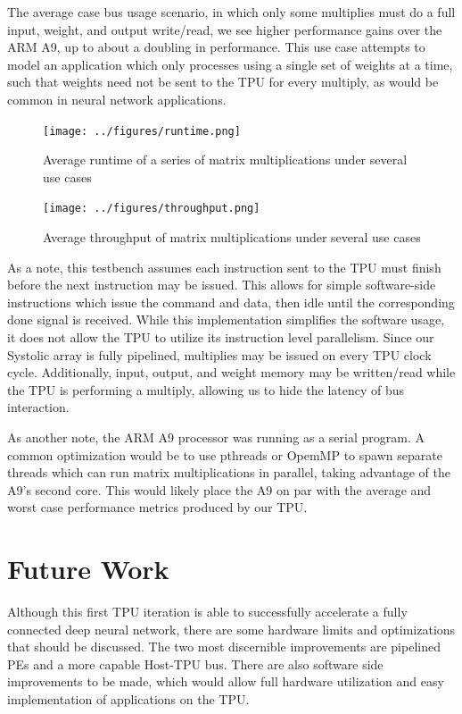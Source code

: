 \documentclass[11pt, conference, onecolumn]{IEEEtran}
\begin{document}
        The average case bus usage scenario, in which only some multiplies must do a
        full input, weight, and output write/read, we see higher performance gains over
        the ARM A9, up to about a doubling in performance. This use case attempts to model
        an application which only processes using a single set of weights at a time, such
        that weights need not be sent to the TPU for every multiply, as would be common
        in neural network applications.

        \begin{figure}[htbp]
            \centering
            \texttt{[image: ../figures/runtime.png]}
            \caption{Average runtime of a series of matrix multiplications under several
                     use cases}
        \end{figure}

        \newpage

        \begin{figure}[htbp]
            \centering
            \texttt{[image: ../figures/throughput.png]}
            \caption{Average throughput of matrix multiplications under several use cases}
        \end{figure}

        As a note, this testbench assumes each instruction sent to the TPU must finish
        before the next instruction may be issued. This allows for simple software-side
        instructions which issue the command and data, then idle until the corresponding
        done signal is received. While this implementation simplifies the software usage,
        it does not allow the TPU to utilize its instruction level parallelism. Since our
        Systolic array is fully pipelined, multiplies may be issued on every TPU clock
        cycle. Additionally, input, output, and weight memory may be written/read while
        the TPU is performing a multiply, allowing us to hide the latency of bus
        interaction.

        As another note, the ARM A9 processor was running as a serial program. A
        common optimization would be to use pthreads or OpemMP to spawn separate threads
        which can run matrix multiplications in parallel, taking advantage of the A9's
        second core. This would likely place the A9 on par with the average and worst case
        performance metrics produced by our TPU.

\section{Future Work}
    Although this first TPU iteration is able to successfully accelerate a fully connected
    deep neural network, there are some hardware limits and optimizations that should be
    discussed. The two most discernible improvements are pipelined PEs and a more capable
    Host-TPU bus. There are also software side improvements to be made, which would allow
    full hardware utilization and easy implementation of applications on the TPU.
\end{document}
